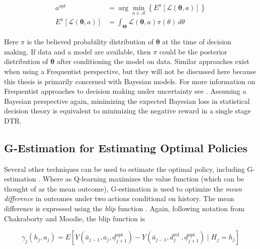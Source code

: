 \begin{align}
	a^{opt} &=  \arg\min_{a \in \mathcal{A}} \left\{ 	E^{\pi}\left[ \mathcal{L}(\boldsymbol{\theta},a) \right] \right\} \\
	E^{\pi}\left[ \mathcal{L}(\boldsymbol{\theta},a) \right] &= \int_{\boldsymbol{\Theta}} \mathcal{L}(\boldsymbol{\theta}, a)  \pi(\theta) \, d\theta\label{reimann_stieltjes}
\end{align}

\noindent Here $\pi$ is the believed probability distribution of $\boldsymbol{\theta}$ at the time of decision making.  If data and a model are available, then $\pi$ could be the posterior distribution of $\boldsymbol{\theta}$ after conditioning the model on data.  Similar approaches exist when using a Frequentist perspective, but they will not be discussed here because this thesis is primarily concerned with Bayesian models.  For more information on Frequentist approaches to decision making under uncertainty see \cite{berger2013statistical}.  Assuming a Bayesian perspective again, minimizing the expected Bayesian loss in statistical decision theory is equivalent to minimizing the negative reward in a single stage DTR.  

\subsection{G-Estimation for Estimating Optimal Policies}

Several other techniques can be used to estimate the optimal policy, including G-estimation \cite{robins2000marginal}.  Where as Q-learning maximizes the value function (which can be thought of as the mean outcome), G-estimation is used to optimize the \textit{mean difference} in outcomes under two actions conditional on history.  The mean difference is expressed using the \textit{blip} function \cite{robins2004optimal}.  Again, following notation from Chakraborty and Moodie, the blip function is

\begin{equation}
	\gamma_j\left(h_j, a_j\right)=E\left[Y\left(\bar{a}_{j-1}, a_j, \underline{d}_{j+1}^{\text {opt }}\right)-Y\left(\bar{a}_{j-1}, d_j^{\text {ref }}, \underline{d}_{j+1}^{\text {opt }}\right) \mid H_j=h_j\right] 
\end{equation}

